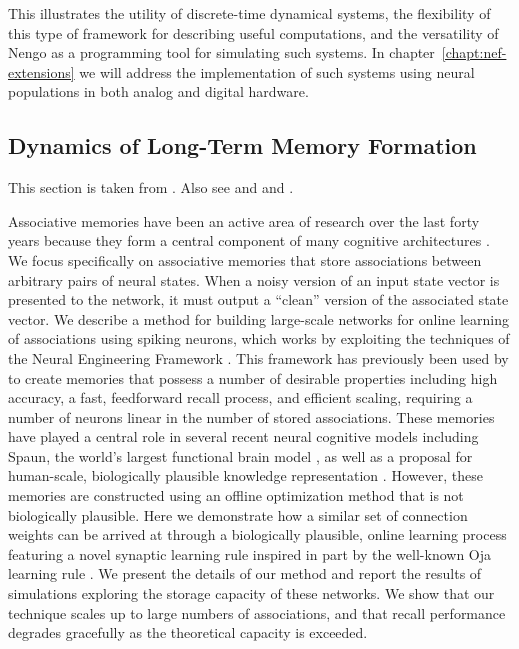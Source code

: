 This illustrates the utility of discrete-time dynamical systems, the flexibility of this type of framework for describing useful computations, and the versatility of Nengo as a programming tool for simulating such systems.
In chapter~\ref{chapt:nef-extensions} we will address the implementation of such systems using neural populations in both analog and digital hardware.

\subsection{Dynamics of Long-Term Memory Formation}

This section is taken from \citet{voelker2014a}. Also see \citet{trujillo2014a} and \citet{aubin2016a} and \citet{knight2016}.

Associative memories have been an active area of research over the last forty years \citep{willshaw1969nonholographic, kohonen1972, hopfield1982} because they form a central component of many cognitive architectures \citep{Pollack1988, Anderson1998}. We focus specifically on associative memories that store associations between arbitrary pairs of neural states. When a noisy version of an input state vector is presented to the network, it must output a ``clean'' version of the associated state vector. We describe a method for building large-scale networks for online learning of associations using spiking neurons, which works by exploiting the techniques of the Neural Engineering Framework \citep{eliasmith2003a}. This framework has previously been used by \citet{stewart2011biologically} to create memories that possess a number of desirable properties including high accuracy, a fast, feedforward recall process, and efficient scaling, requiring a number of neurons linear in the number of stored associations. These memories have played a central role in several recent neural cognitive models including Spaun, the world's largest functional brain model \citep{eliasmith2012}, as well as a proposal for human-scale, biologically plausible knowledge representation \citep{crawford2015}. However, these memories are constructed using an offline optimization method that is not biologically plausible.  Here we demonstrate how a similar set of connection weights can be arrived at through a biologically plausible, online learning process featuring a novel synaptic learning rule inspired in part by the well-known Oja learning rule \citep{oja1989neural}. We present the details of our method and report the results of simulations exploring the storage capacity of these networks. We show that our technique scales up to large numbers of associations, and that recall performance degrades gracefully as the theoretical capacity is exceeded. 

